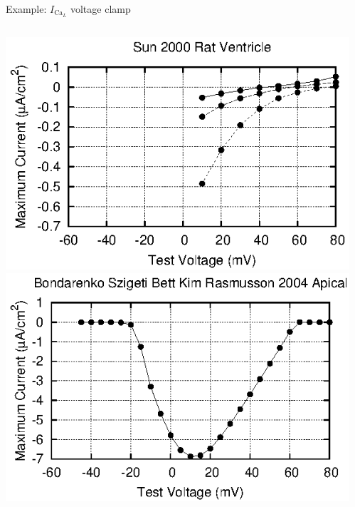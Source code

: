 \documentclass[t,xcolor={usenames,dvipsnames}]{beamer}
\begin{document}
\begin{frame}{Example: $I_{\textrm{Ca}_L}$ voltage clamp}
\begin{columns}[T]
\begin{column}{.33\linewidth}
\begin{center}
\includegraphics[width=\textwidth]{sun_rat_ventricle_ICaL_IV_curve}\\
\vspace{.1cm}
\includegraphics[width=\textwidth]{bondarenko_szigeti_bett_kim_rasmusson_2004_apical_ICaL_IV_curve}
\end{center}
\end{column}
\begin{column}{.33\linewidth}
\begin{center}

\end{center}
\end{column}
\end{columns}
\end{frame}
\end{document}
